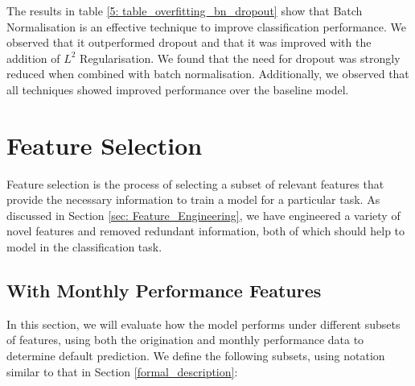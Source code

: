         The results in table \ref{5: table_overfitting_bn_dropout} show that Batch Normalisation is an effective technique to improve classification performance. We observed that it outperformed dropout and that it was improved with the addition of $L^2$ Regularisation. We found that the need for dropout was strongly reduced when combined with batch normalisation. Additionally, we observed that all techniques showed improved performance over the baseline model. 
        







    \section{Feature Selection}
        Feature selection is the process of selecting a subset of relevant features that provide the necessary information to train a model for a particular task. As discussed in Section \ref{sec: Feature_Engineering}, we have engineered a variety of novel features and removed redundant information, both of which should help to model in the classification task. 
        
        \subsection{With Monthly Performance Features} \label{monthly_performance_features_results}

            In this section, we will evaluate how the model performs under different subsets of features, using both the origination and monthly performance data to determine default prediction. We define the following subsets, using notation similar to that in Section \ref{formal_description}:  
        

